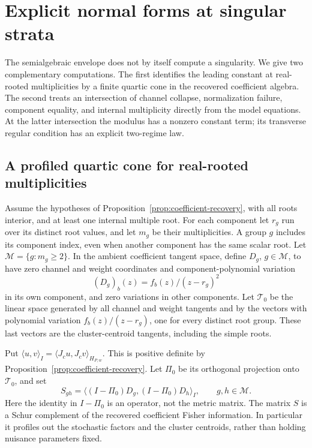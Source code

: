 \section{Explicit normal forms at singular strata}
\label{sec:singular-normal-forms}
The semialgebraic envelope does not by itself compute a singularity.
We give two complementary computations. The first identifies the
leading constant at real-rooted multiplicities by a finite quartic
cone in the recovered coefficient algebra. The second treats an
intersection of channel collapse, normalization failure, component
equality, and internal multiplicity directly from the model equations.
At the latter intersection the modulus has a nonzero constant term;
its transverse regular condition has an explicit two-regime law.

\subsection{A profiled quartic cone for real-rooted multiplicities}
Assume the hypotheses of Proposition~\ref{prop:coefficient-recovery},
with all roots interior, and at least one internal multiple root.
For each component let $r_g$ run over its distinct root values, and
let $m_g$ be their multiplicities. A group $g$ includes its component
index, even when another component has the same scalar root.
Let $\mathcal M=\{g:m_g\ge2\}$. In the ambient coefficient tangent
space, define $D_g$, $g\in\mathcal M$, to have zero channel and weight
coordinates and component-polynomial variation
\[
 (D_g)_b(z)=f_b(z)/(z-r_g)^2
\]
in its own component, and zero variations in other components.
Let $\mathcal T_0$ be the linear space generated by all channel and
weight tangents and by the vectors with polynomial variation
$f_b(z)/(z-r_g)$, one for every distinct root group. These last
vectors are the cluster-centroid tangents, including the simple roots.

Put $\langle u,v\rangle_I=\langle J_cu,J_cv\rangle_{H_{P,w}}$.
This is positive definite by Proposition~\ref{prop:coefficient-recovery}.
Let $\Pi_0$ be its orthogonal projection onto $\mathcal T_0$, and set
\begin{equation}\label{eq:profiled-split-information}
 S_{gh}=\langle (I-\Pi_0)D_g,(I-\Pi_0)D_h\rangle_I,
                         \qquad g,h\in\mathcal M.
\end{equation}
Here the identity in $I-\Pi_0$ is an operator, not the metric matrix.
The matrix $S$ is a Schur complement of the recovered coefficient
Fisher information. In particular it profiles out the stochastic
factors and the cluster centroids, rather than holding nuisance
parameters fixed.

